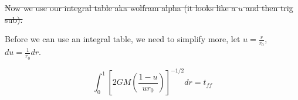 \sout{Now we use our integral table aka wolfram alpha (it looks like a $u$ and then trig sub).}

Before we can use an integral table, we need to simplify more, let $u = \frac{r}{r_0}$, $du = \frac{1}{r_0}dr$. 

\begin{equation}
    \int_{0}^{1} 
    [2GM(\frac{1-u}{ur_0})]^{-1/2} dr 
    = t_{ff}
\end{equation}







